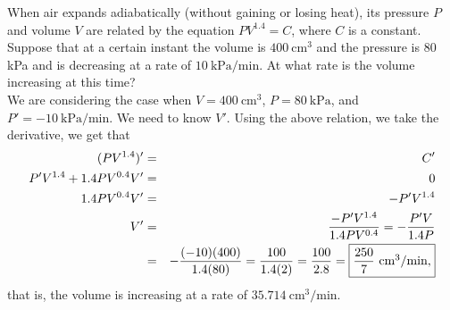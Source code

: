 \documentclass{book}
\begin{document}
\begin{Exam} When air expands adiabatically (without gaining or losing heat), its pressure $P$ and volume $V$ are related by the equation $PV^{1.4}=C$, where $C$ is a constant. Suppose that at a certain instant the volume is $400\ \text{cm}^3$ and the pressure is $80$ kPa and is decreasing at a rate of $10\ \text{kPa}/\text{min}$. At what rate is the volume increasing at this time?\\

We are considering the case when $V = 400\ \text{cm}^3$, $P = 80\ \text{kPa}$, and $P' = -10\ \text{kPa}/\text{min}$. We need to know $V'$. Using the above relation, we take the derivative, we get that
\begin{eqnarray*}
(PV^{1.4})' &=& C'\\
P'V^{1.4} + 1.4PV^{0.4}V' &=& 0\\
1.4PV^{0.4}V' &=& -P'V^{1.4}\\
V' &=& \dfrac{-P'V^{1.4}}{1.4PV^{0.4}} = -\dfrac{P'V}{1.4P}\\
 &=& -\dfrac{(-10)(400)}{1.4(80)}= \dfrac{100}{1.4(2)} = \dfrac{100}{2.8} = \fbox{$\dfrac{250}{7}\ \text{cm}^3/\text{min}$,}
\end{eqnarray*} that is, the volume is increasing at a rate of $35.714\ \text{cm}^3/\text{min}$. 
\end{Exam}\vs
\end{document}
